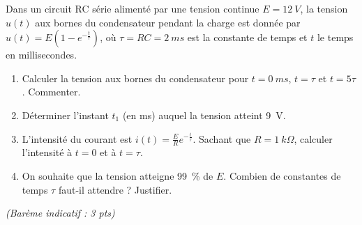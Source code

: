 \documentclass[11pt]{article}
\begin{document}
\begin{exercice}
Dans un circuit RC série alimenté par une tension continue $E = \SI{12}{V}$, la tension $u(t)$ aux bornes du condensateur pendant la charge est donnée par $u(t) = E\left(1 - e^{-\frac{t}{\tau}}\right)$, où $\tau = RC = \SI{2}{ms}$ est la constante de temps et $t$ le temps en millisecondes.
\begin{enumerate}
    \item Calculer la tension aux bornes du condensateur pour $t = \SI{0}{ms}$, $t = \tau$ et $t = 5\tau$. Commenter.
    \item Déterminer l'instant $t_1$ (en ms) auquel la tension atteint \SI{9}{V}. 
    \item L'intensité du courant est $i(t) = \frac{E}{R}e^{-\frac{t}{\tau}}$. Sachant que $R = \SI{1}{k\Omega}$, calculer l'intensité à $t = 0$ et à $t = \tau$.
    \item On souhaite que la tension atteigne \SI{99}{\%} de $E$. Combien de constantes de temps $\tau$ faut-il attendre ? Justifier.
\end{enumerate}
\hfill \textit{(Barème indicatif : 3 pts)}
\end{exercice}
\end{document}
